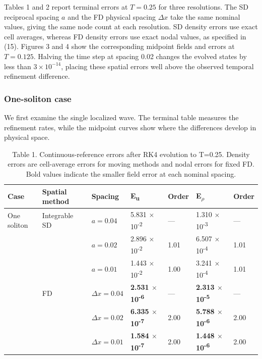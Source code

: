 \documentclass[11pt,a4paper]{article}
\begin{document}
Tables 1 and 2 report terminal errors at \(T=0.25\) for three resolutions. The SD reciprocal spacing \(a\) and the FD physical spacing \(\Delta x\) take the same nominal values, giving the same node count at each resolution. SD density errors use exact cell averages, whereas FD density errors use exact nodal values, as specified in (15). Figures 3 and 4 show the corresponding midpoint fields and errors at \(T=0.125\). Halving the time step at spacing 0.02 changes the evolved states by less than \(3\times10^{-14}\), placing these spatial errors well above the observed temporal refinement difference.

\subsubsection*{One-soliton case}

We first examine the single localized wave. The terminal table measures the refinement rates, while the midpoint curves show where the differences develop in physical space.

\begin{table}[!htbp]
\centering
\caption*{Table 1. Continuous-reference errors after RK4 evolution to T=0.25. Density errors are cell-average errors for moving methods and nodal errors for fixed FD. Bold values indicate the smaller field error at each nominal spacing.}
\small
\setlength{\tabcolsep}{4pt}
\renewcommand{\arraystretch}{1.22}
\begin{tabularx}{\linewidth}{YYYYYYY}
\toprule
Case & Spatial method & Spacing & E\textsubscript{u} & Order & E\textsubscript{\(\rho\)} & Order \\
\midrule
One soliton & Integrable SD & \(a=0.04\) & 5.831 \(\times\) 10\textsuperscript{-2} & — & 1.310 \(\times\) 10\textsuperscript{-3} & — \\
 &  & \(a=0.02\) & 2.896 \(\times\) 10\textsuperscript{-2} & 1.01 & 6.507 \(\times\) 10\textsuperscript{-4} & 1.01 \\
 &  & \(a=0.01\) & 1.443 \(\times\) 10\textsuperscript{-2} & 1.00 & 3.241 \(\times\) 10\textsuperscript{-4} & 1.01 \\
 & FD & \(\Delta x=0.04\) & \textbf{2.531 \(\times\) 10\textsuperscript{-6}} & — & \textbf{2.313 \(\times\) 10\textsuperscript{-5}} & — \\
 &  & \(\Delta x=0.02\) & \textbf{6.335 \(\times\) 10\textsuperscript{-7}} & 2.00 & \textbf{5.788 \(\times\) 10\textsuperscript{-6}} & 2.00 \\
 &  & \(\Delta x=0.01\) & \textbf{1.584 \(\times\) 10\textsuperscript{-7}} & 2.00 & \textbf{1.448 \(\times\) 10\textsuperscript{-6}} & 2.00 \\
\bottomrule
\end{tabularx}
\end{table}
\end{document}
